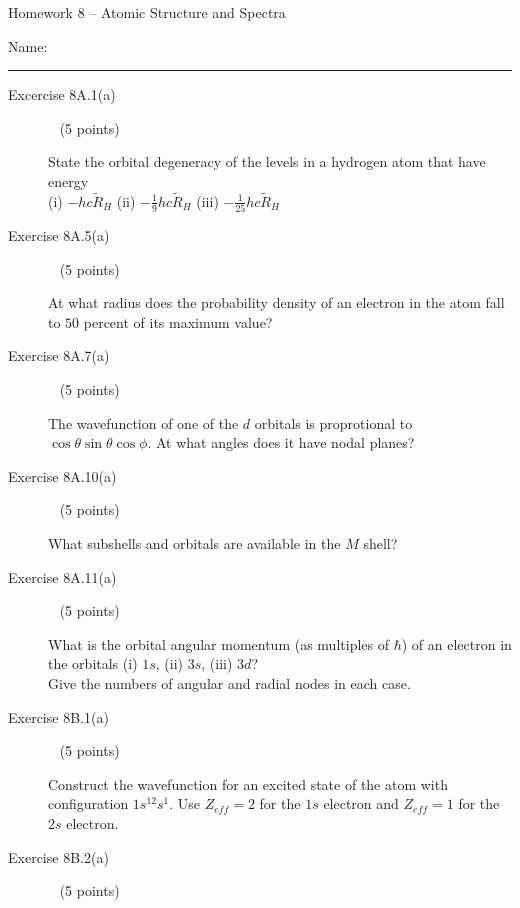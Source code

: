 \documentclass[10pt, letterpaper]{memoir}
\begin{document}
\begin{center}
	{\large Homework 8 -- Atomic Structure and Spectra}
\end{center}

Name: \rule[-.1mm]{15em}{0.1pt}

\begin{description}
	\item [Excercise 8A.1(a)] ~ (5 points)
	
	State the orbital degeneracy of the levels in a hydrogen atom that have energy \\(i) $-hc\tilde{R}_H$ (ii) $-\frac{1}{9}hc\tilde{R}_H$ (iii) $-\frac{1}{25}hc\tilde{R}_H$
	
	\vspace{8em}
	\item [Exercise 8A.5(a)] ~ (5 points)
	
	At what radius does the probability density of an electron in the  atom fall to $50$ percent of its maximum value?
	
	\vspace{14em}
	\item [Exercise 8A.7(a)] ~ (5 points)
	
	The wavefunction of one of the $d$ orbitals is proprotional to $\cos\theta\sin\theta\cos\phi$. At what angles does it have nodal planes?
	
	\vspace{12em}
	\item [Exercise 8A.10(a)] ~ (5 points)
	
	What subshells and orbitals are available in the $M$ shell?

	\vspace{10em}
	\item [Exercise 8A.11(a)] ~ (5 points)
	
	What is the orbital angular momentum (as multiples of $\hbar$) of an electron in the orbitals (i) $1s$, (ii) $3s$, (iii) $3d$? \\Give the numbers of angular and radial nodes in each case.
	
	\vspace{12em}
	\item [Exercise 8B.1(a)] ~ (5 points)
	
	Construct the wavefunction for an excited state of the  atom with configuration $1s^12s^1$. Use $Z_{eff}=2$ for the $1s$ electron and $Z_{eff}=1$ for the $2s$ electron.
	
	\vspace{8em}
	\item [Exercise 8B.2(a)] ~ (5 points)
	

\end{description}
\end{document}
